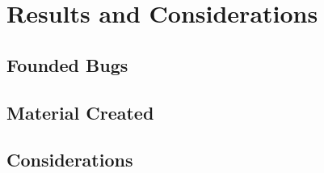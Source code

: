 \chapter{Results and Considerations}

\section{Founded Bugs}

\section{Material Created}

\section{Considerations}